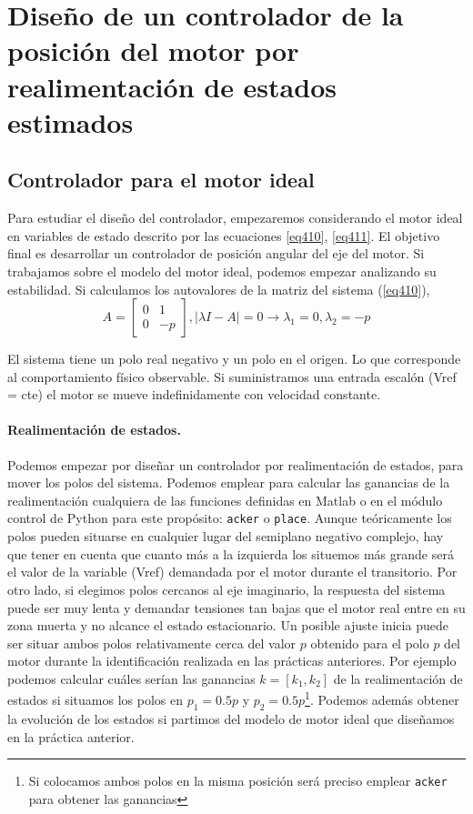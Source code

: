 \documentclass[10pt,a4paper]{report}
\begin{document}
\section{Diseño de un controlador de la posición del motor por realimentación de estados estimados}
\subsection{Controlador para el motor ideal}
Para estudiar el diseño del controlador, empezaremos considerando el motor ideal en variables de estado descrito por las ecuaciones \ref{eq410}, \ref{eq411}. El objetivo final es desarrollar un controlador de posición angular del eje del motor. Si trabajamos sobre el modelo del motor ideal, podemos empezar analizando su estabilidad. Si calculamos los autovalores de la matriz del sistema (\ref{eq410}),
\begin{equation}
A = \begin{bmatrix}
0 & 1\\
0 &-p
\end{bmatrix}, \vert \lambda I-A\vert = 0 \rightarrow \lambda_1 = 0, \lambda_2=-p
\end{equation}

El sistema tiene un polo real negativo y un polo en el origen. Lo que corresponde al comportamiento físico observable. Si suministramos una entrada escalón (Vref = cte) el motor se mueve indefinidamente con velocidad constante. 

\paragraph{Realimentación de estados.} Podemos empezar por diseñar un controlador por realimentación de estados, para mover los polos del sistema.  Podemos emplear para calcular las ganancias de la realimentación cualquiera de las funciones definidas en Matlab o en el módulo control de Python para este propósito: \texttt{acker} o \texttt{place}. Aunque teóricamente los polos pueden situarse en cualquier lugar del semiplano negativo complejo, hay que tener en cuenta que cuanto más a la izquierda los situemos más grande será el valor de la variable (Vref) demandada por el motor durante el transitorio. Por otro lado, si elegimos polos cercanos al eje imaginario, la respuesta del sistema puede ser muy lenta  y demandar tensiones tan bajas que el motor real entre en su zona muerta y no alcance el estado estacionario. Un posible ajuste inicia puede ser situar ambos polos relativamente cerca del valor $p$ obtenido para el polo $p$ del motor durante la identificación realizada en las prácticas anteriores. Por ejemplo podemos calcular cuáles serían las ganancias $k = [k_1, k_2]$ de la realimentación de estados si situamos los polos en $p_1 = 0.5p$ y $p_2 = 0.5p$\footnote{Si colocamos ambos polos en la misma posición será preciso emplear \texttt{acker} para obtener las ganancias}. Podemos además obtener la evolución de los estados si partimos del modelo de motor ideal que diseñamos en la práctica anterior.  
\end{document}
